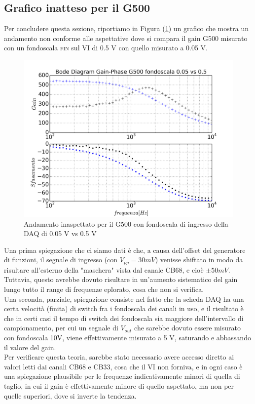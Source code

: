 \documentclass[journal, a4paper]{IEEEtran}
\begin{document}
\subsection{Grafico inatteso per il G500}

Per concludere questa sezione, riportiamo in Figura (\ref{fig:es_9_bode_g500_strano_bi}) un grafico che mostra un andamento non conforme alle aspettative dove si compara il gain G500 misurato con un fondoscala \textsc{fin} sul VI di 0.5 V con quello misurato a 0.05 V.\\


\begin{figure}
\centering
\includegraphics[width=0.9\linewidth]{./es_9_bode_g500_strano_bi}
\caption{Andamento inaspettato per il G500 con fondoscala di ingresso della DAQ di 0.05 V vs 0.5 V}
\label{fig:es_9_bode_g500_strano_bi}
\end{figure}

Una prima spiegazione che ci siamo dati è che, a causa dell'offset del generatore di funzioni, il segnale di ingresso (con $V_{pp} = 30 \si{mV}$) venisse shiftato in modo da risultare all'esterno della "maschera" vista dal canale CB68, e cioè $\pm 50 \si{mV}$. Tuttavia, questo avrebbe dovuto risultare in un'aumento sistematico del gain lungo tutto il range di frequenze eplorato, cosa che non si verifica.\\

Una seconda, parziale, spiegazione consiste nel fatto che la scheda DAQ ha una certa velocità (finita) di switch fra i fondoscala dei canali in uso, e il risultato è che in certi casi il tempo di switch dei fondoscala sia maggiore dell'intervallo di campionamento, per cui un segnale di $V_{out}$ che sarebbe dovuto essere misurato con fondoscala 10V, viene effettivamente misurato a 5 V, saturando e abbassando il valore del gain. \\
Per verificare questa teoria, sarebbe stato necessario avere accesso diretto ai valori letti dai canali CB68 e CB33, cosa che il VI non forniva, e in ogni caso è una spiegazione plausibile per le frequenze indicativamente minori di quella di taglio, in cui il gain è effettivamente minore di quello aspettato, ma non per quelle superiori, dove si inverte la tendenza.
\end{document}
